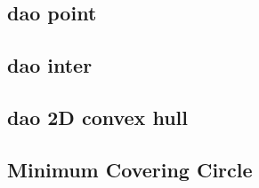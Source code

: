 \documentclass[a4paper,10pt,twocolumn,oneside]{article}
\begin{document}
\subsection{dao point}


\subsection{dao inter}


\subsection{dao 2D convex hull}


%

%

%

\subsection{Minimum Covering Circle}


%

%
\end{document}
